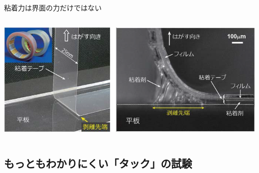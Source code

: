 \documentclass[unicode,12pt]{beamer}%
\begin{document}
\begin{frame}
\begin{block}{粘着力は界面の力だけではない}
\begin{columns}[c, onlytextwidth]
			\centering
			\includegraphics[width=\textwidth]{hakuri.png}
		\end{columns}
	\end{block}
\end{frame}

\subsection{もっともわかりにくい「タック」の試験}
\end{document}
